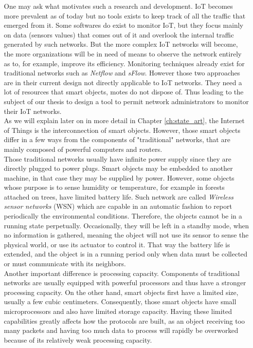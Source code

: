 One may ask what motivates such a research and development. IoT becomes more prevalent as of today but no tools exists to keep track of all the traffic that emerged from it. Some softwares do exist to monitor IoT, but they focus mainly on data (sensors values) that comes out of it and overlook the internal traffic generated by such networks. But the more complex IoT networks will become, the more organizations will be in need of means to observe the network entirely as to, for example, improve its efficiency. Monitoring techniques already exist for traditional networks such as \textit{Netflow} and \textit{sFlow}. However those two approaches are in their current design not directly applicable to IoT networks. They need a lot of resources that smart objects, motes do not dispose of. Thus leading to the subject of our thesis to design a tool to permit network administrators to monitor their IoT networks.\\

As we will explain later on in more detail in Chapter \ref{ch:state_art}, the Internet of Things is the interconnection of smart objects. However, those smart objects differ in a few ways from the components of "traditional" networks, that are mainly composed of powerful computers and routers.\\

Those traditional networks usually have infinite power supply since they are directly plugged to power plugs. Smart objects may be embedded to another machine, in that case they may be supplied by power. However, some objects whose purpose is to sense humidity or temperature, for example in forests attached on trees, have limited battery life.  Such network are called \textit{Wireless sensor networks} (WSN) which are capable in an automatic fashion to report periodically the environmental conditions. Therefore, the objects cannot be in a running state perpetually. Occasionally, they will be left in a standby mode, when no information is gathered, meaning the object will not use its sensor to sense the physical world, or use its actuator to control it. That way the battery life is extended, and the object is in a running period only when data must be collected or must communicate with its neighbors. \\

Another important difference is processing capacity. Components of traditional networks are usually equipped with powerful processors and thus have a stronger processing capacity. On the other hand, smart objects first have a limited size, usually a few cubic centimeters. Consequently, those smart objects have small microprocessors and also have limited storage capacity. Having these limited capabilities greatly affects how the protocols are built, as an object receiving too many packets and having too much data to process will rapidly be overworked because of its relatively weak processing capacity. \\

